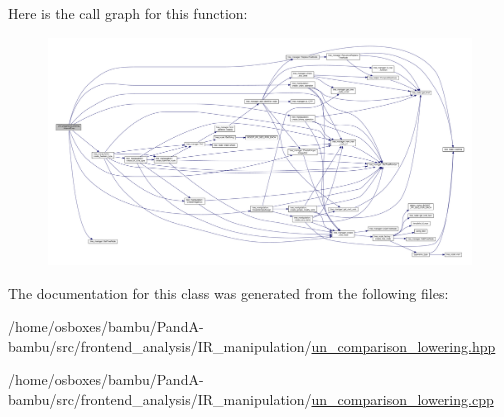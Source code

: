 Here is the call graph for this function\+:
\nopagebreak
\begin{figure}[H]
\begin{center}
\leavevmode
\includegraphics[width=350pt]{dc/d54/classUnComparisonLowering_ac4701f059a92948a4b7a5157b53a36df_cgraph}
\end{center}
\end{figure}


The documentation for this class was generated from the following files\+:\begin{DoxyCompactItemize}
\item 
/home/osboxes/bambu/\+Pand\+A-\/bambu/src/frontend\+\_\+analysis/\+I\+R\+\_\+manipulation/\hyperlink{un__comparison__lowering_8hpp}{un\+\_\+comparison\+\_\+lowering.\+hpp}\item 
/home/osboxes/bambu/\+Pand\+A-\/bambu/src/frontend\+\_\+analysis/\+I\+R\+\_\+manipulation/\hyperlink{un__comparison__lowering_8cpp}{un\+\_\+comparison\+\_\+lowering.\+cpp}\end{DoxyCompactItemize}
